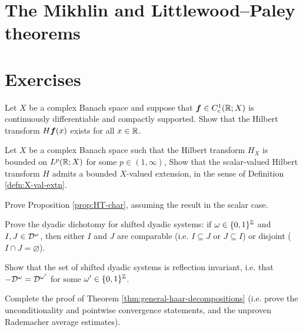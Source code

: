 \section{The Mikhlin and Littlewood--Paley  theorems}

\section{Exercises}

\begin{exercise}\label{ex:HT-C1}
  Let $X$ be a complex Banach space and suppose that $\bm{f} \in C_{c}^1(\mathbb{R};X)$ is continuously differentiable and compactly supported.
  Show that the Hilbert transform $H\bm{f}(x)$ exists for all $x \in \mathbb{R}$.
\end{exercise}

\begin{exercise}
  Let $X$ be a complex Banach space such that the Hilbert transform $H_{X}$ is bounded on $L^p(\mathbb{R};X)$ for some $p \in (1,\infty)$,
  Show that the scalar-valued Hilbert transform $H$ admits a bounded $X$-valued extension, in the sense of Definition \ref{defn:X-val-extn}.
\end{exercise}

\begin{exercise}\label{ex:HT-char}
  Prove Proposition \ref{prop:HT-char}, assuming the result in the scalar case.
\end{exercise}

\begin{exercise}\label{ex:dyadic-dichotomy}
  Prove the dyadic dichotomy for shifted dyadic systems: if $\omega \in \{0,1\}^{\mathbb{Z}}$ and $I,J \in \mathcal{D}^{\omega}$, then either $I$ and $J$ are comparable (i.e. $I \subseteq J$ or $J \subseteq I$) or disjoint ($I \cap J = \varnothing$).
\end{exercise}

\begin{exercise}\label{ex:dyadic-refln-invariance}
  Show that the set of shifted dyadic systems is reflection invariant, i.e. that $-\mathcal{D}^{\omega} = \mathcal{D}^{\omega'}$ for some $\omega' \in \{0,1\}^{\mathbb{Z}}$.
\end{exercise}

\begin{exercise}\label{ex:mgale-reduction}
  Complete the proof of Theorem \ref{thm:general-haar-decompositions} (i.e. prove the unconditionality and pointwise convergence statements, and the unproven Rademacher average estimates).
\end{exercise}




